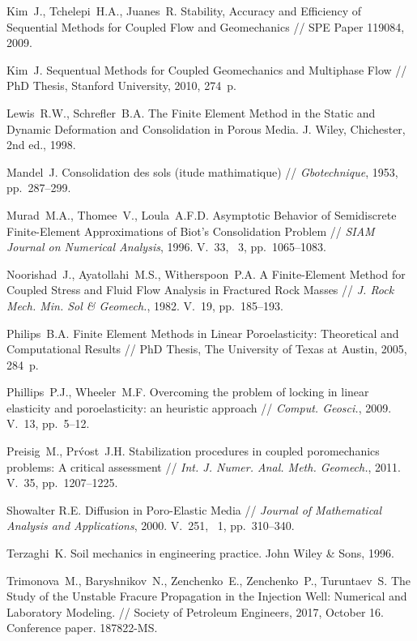 \begin{thebibliography}{1000}
Kim~J., Tchelepi~H.A., Juanes~R. Stability, Accuracy and Efficiency of Sequential Methods
for Coupled Flow and Geomechanics // SPE Paper 119084, 2009. 

Kim~J. Sequentual Methods for Coupled Geomechanics and Multiphase Flow //
PhD Thesis, Stanford University, 2010, 274~p.

Lewis~R.W., Schrefler~B.A. The Finite Element
Method in the Static and Dynamic Deformation and Consolidation in
Porous Media. J. Wiley, Chichester, 2nd ed., 1998.

Mandel~J. Consolidation des sols (itude mathimatique) // \emph{Gbotechnique}, 1953, pp.~287--299.

Murad~M.A., Thomee~V., Loula~A.F.D.
Asymptotic Behavior of Semidiscrete Finite-Element Approximations of Biot's Consolidation
Problem // \emph{SIAM Journal on Numerical Analysis}, 1996.
V.~33, \No~3, pp.~1065--1083.

Noorishad~J., Ayatollahi~M.S., Witherspoon~P.A.
A Finite-Element Method for Coupled
Stress and Fluid Flow Analysis in
Fractured Rock Masses // \emph{J. Rock Mech. Min. Sol \& Geomech.}, 1982.
V.~19, pp.~185--193.

Philips~B.A.
Finite Element Methods in Linear Poroelasticity:
Theoretical and Computational Results // PhD Thesis, The University of Texas at Austin, 2005, 284~p.

Phillips~P.J., Wheeler~M.F.
Overcoming the problem of locking in linear elasticity
and poroelasticity: an heuristic approach // \emph{Comput. Geosci.}, 2009.
V.~13, pp.~5--12.

Preisig~M., Pr\'vost~J.H.
Stabilization procedures in coupled poromechanics problems:
A critical assessment // \emph{Int. J. Numer. Anal. Meth. Geomech.}, 2011.
V.~35, pp.~1207--1225.

Showalter R.E.
Diffusion in Poro-Elastic Media // \emph{Journal of Mathematical Analysis and Applications}, 2000.
V.~251, \No~1, pp.~310--340.

Terzaghi~K. Soil mechanics in engineering practice. John Wiley \& Sons, 1996.

Trimonova~M., Baryshnikov~N., Zenchenko~E., Zenchenko~P., Turuntaev~S.
The Study of the Unstable Fracure Propagation in the Injection Well: Numerical and Laboratory Modeling. // 
Society of Petroleum Engineers, 2017, October 16. 
Conference paper. 187822-MS. 


\end{thebibliography}
